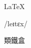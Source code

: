 \documentclass{article}
\begin{document}
	\fontsize{72}{108}\selectfont
	\centering
	
	\LaTeX
	
	/leɪtɛx/
	
	類鐵盒
\end{document}
